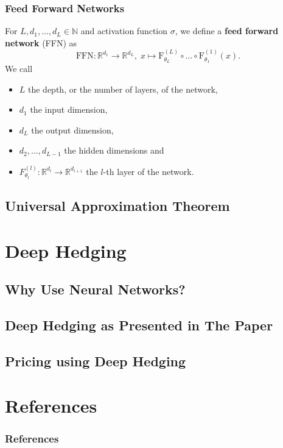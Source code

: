\documentclass[serif]{beamer}
\def\R{{\mathbb R}}
\def\N{{\mathbb N}}
\begin{document}
\begin{frame}
    \frametitle{Feed Forward Networks}
    For $L, d_1, \ldots, d_L \in \N$
    and activation function $\sigma$,
    we define a \textbf{feed forward network} (FFN) as
    \[
        \text{FFN}: \R^{d_1} \to \R^{d_L}, \;
        x \mapsto \text{F}_{\theta_L}^{(L)} \circ \ldots \circ \text{F}_{\theta_1}^{(1)} (x).
    \]
    We call
    \begin{itemize}
        \item $L$ the depth, or the number of layers, of the network,
        \item $d_1$ the input dimension,
        \item $d_L$ the output dimension,
        \item $d_2, \ldots, d_{L-1}$ the hidden dimensions and
        \item $F_{\theta_l}^{(l)}: \R^{d_l} \to \R^{d_{l+1}}$ the $l$-th layer of the network.
    \end{itemize}
\end{frame}

\subsection{Universal Approximation Theorem}

\section{Deep Hedging}

\subsection{Why Use Neural Networks?}
\subsection{Deep Hedging as Presented in The Paper}
\subsection{Pricing using Deep Hedging}

\section{References}
\begin{frame}
    \frametitle{References}
    
    
\end{frame}
\end{document}
